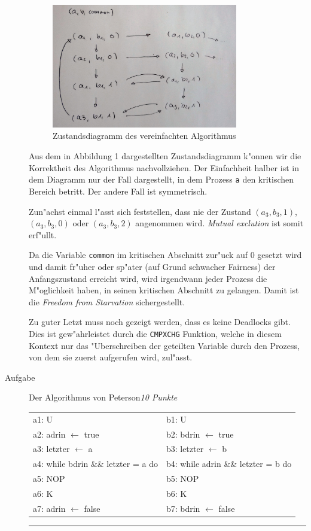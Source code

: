 \documentclass[a4paper,twoside,12pt,fleqn]{article}
\newcounter{AUFGNR}
\newcommand{\AUFGABE}[2]{\vspace{0.3cm}\item[Aufgabe~\arabic{AUFGNR}]\stepcounter{AUFGNR} #1\hfill\emph{#2}}
\begin{document}
\begin{description}
	\begin{figure}[htbp]
		\centering
		\includegraphics[width=0.8\textwidth]{zustand.jpg}
		\caption{Zustandsdiagramm des vereinfachten Algorithmus}
		\label{zsd}
	\end{figure}

	Aus dem in Abbildung 1 dargestellten Zustandsdiagramm k"onnen wir die Korrektheit des Algorithmus nachvollziehen. Der Einfachheit halber ist in dem Diagramm nur der Fall dargestellt, in dem Prozess \texttt{a} den kritischen Bereich betritt. Der andere Fall ist symmetrisch.

	Zun"achst einmal l"asst sich feststellen, dass nie der Zustand $(a_3, b_3, 1)$, $(a_3, b_3, 0)$ oder $(a_3, b_3, 2)$ angenommen wird. \textit{Mutual exclution} ist somit erf"ullt.

	Da die Variable \texttt{common} im kritischen Abschnitt zur"uck auf $0$ gesetzt wird und damit fr"uher oder sp"ater (auf Grund schwacher Fairness) der Anfangszustand erreicht wird, wird irgendwann jeder Prozess die M"oglichkeit haben, in seinen kritischen Abschnitt zu gelangen. Damit ist die \textit{Freedom from Starvation} sichergestellt.

	Zu guter Letzt muss noch gezeigt werden, dass es keine Deadlocks gibt. Dies ist gew"ahrleistet durch die \texttt{CMPXCHG} Funktion, welche in diesem Kontext nur das "Uberschreiben der geteilten Variable durch den Prozess, von dem sie zuerst aufgerufen wird, zul"asst.


	\AUFGABE{Der Algorithmus von Peterson}{10 Punkte}
	\begin{tabular}{l|l}
		a1: U                               & b1: U                        \\
		a2: adrin $\leftarrow$ true         & b2: bdrin $\leftarrow$ true  \\
		a3: letzter $\leftarrow$ a          & b3: letzter $\leftarrow$ b   \\
		a4: while bdrin \&\& letzter = a do &
		b4: while adrin \&\& letzter = b do                                \\
		a5: \quad NOP                       & b5: \quad NOP                \\
		a6: K                               & b6: K                        \\
		a7: adrin $\leftarrow$ false        & b7: bdrin $\leftarrow$ false
	\end{tabular}
	\hrule


\end{description}
\end{document}
